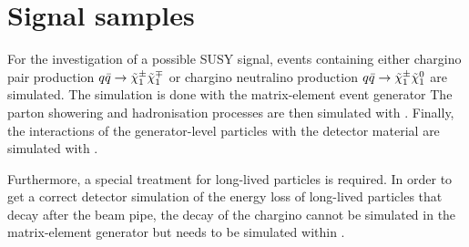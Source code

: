 \section{Signal samples}
\label{sec:SignalSamples}
For the investigation of a possible SUSY signal, events containing either chargino pair production $q\bar{q} \rightarrow \tilde{\chi}^{\pm}_{1} \tilde{\chi}^{\mp}_{1}$ or chargino neutralino production $q\bar{q} \rightarrow \tilde{\chi}^{\pm}_{1} \tilde{\chi}^{0}_{1}$ are simulated. 
The simulation is done with the matrix-element event generator \madgraph \cite{bib:Madgraph_2014}
The parton showering and hadronisation processes are then simulated with \pythia \cite{bib:Pyhtia6_2006}.
Finally, the interactions of the generator-level particles with the detector material are simulated  with \geant \cite{bib:Geant4_2003,bib:Geant4_2006}.

Furthermore, a special treatment for long-lived particles is required.
In order to get a correct detector simulation of the energy loss of long-lived particles that decay after the beam pipe, the decay of the chargino cannot be simulated in the matrix-element generator 
but needs to be simulated within \geant.

